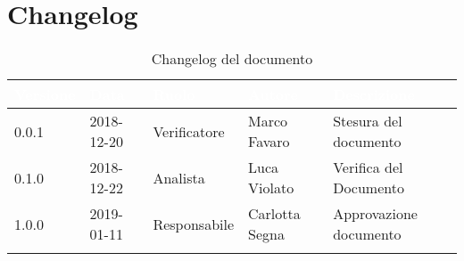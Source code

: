 \newpage

\section{Changelog}

\begin{center}
\begin{longtable}[c]{|m{}|m{}|m{}|m{}|p{}|}
\hline
\rowcolor{bluelogo}\textbf{\textcolor{white}{Versione}} & \textbf{\textcolor{white}{Data}} & \textbf{\textcolor{white}{Ruolo}} & \textbf{\textcolor{white}{Autore}} & \textbf{\textcolor{white}{Descrizione}}\\
\hline \hline
\endfirsthead
0.0.1 & 2018-12-20  & Verificatore & Marco Favaro & Stesura del documento \\
\hline
\rowcolor{grigio} 0.1.0 & 2018-12-22 & Analista & Luca Violato & Verifica del Documento \\
\hline
1.0.0 & 2019-01-11 & Responsabile & Carlotta Segna & Approvazione documento \\
\hline
\caption{Changelog del documento}
\end{longtable}
\end{center}
